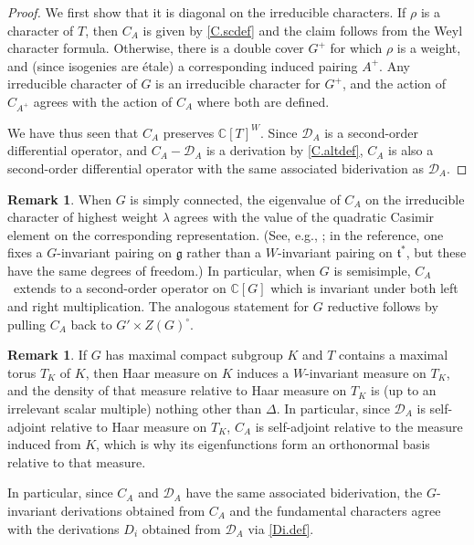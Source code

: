 \documentclass[JEP,XML,SOM,Unicode,NoFloatCountersInSection,published]{cedram}
\theoremstyle{definition}
\newtheorem{rmk}[equation]{Remark}
\let\ic\circ
\newcommand{\mfg}{\mathfrak{g}}
\newcommand{\mft}{\mathfrak{t}}
\newcommand{\C}{\mathbb{C}}
\newcommand{\mcD}{\mathcal{D}}
\begin{document}
\begin{proof}
We first show that it is diagonal on the irreducible characters. If
$\rho$ is a character of $T$, then $C_A$ is given by \eqref{C.scdef} and the claim follows from the Weyl character formula. Otherwise,
there is a double cover $G^+$ for which $\rho$ is a weight, and (since
isogenies are étale) a corresponding induced pairing $A^+$. Any irreducible
character of $G$ is an irreducible character for $G^+$, and the action of
$C_{A^+}$ agrees with the action of $C_A$ where both are defined.

We have thus seen that $C_A$ preserves $\C[T]^W$. Since $\mcD_A$ is a second-order differential operator, and $C_A - \mcD_A$ is a derivation by \eqref{C.altdef}, $C_A$ is also a second-order differential operator with the same associated biderivation as $\mcD_A$.
\end{proof}

\begin{rmk}
When $G$ is simply connected, the eigenvalue of $C_A$ on the irreducible
character of highest weight $\lambda$ agrees with the value of the
quadratic Casimir element on the corresponding representation. (See,
e.g., \cite[Prop.\,10.6]{Hall:2nd}; in the reference, one fixes a
$G$-invariant pairing on $\mfg$ rather than a $W$-invariant pairing
on $\mft^*$, but these have the same degrees of freedom.) In
particular, when $G$ is semisimple, $C_A$~extends to a second-order
operator on $\C[G]$ which is invariant under both left and right
multiplication. The analogous statement for $G$ reductive follows by
pulling $C_A$ back to $G'\times Z(G)^\ic$.
\end{rmk}

\begin{rmk}
If $G$ has maximal compact subgroup $K$ and $T$ contains a maximal torus
$T_K$ of $K$, then Haar measure on $K$ induces a $W$-invariant measure on $T_K$,
and the density of that measure relative to Haar measure on $T_K$ is (up
to an irrelevant scalar multiple) nothing other than $\Delta$. In
particular, since $\mcD_A$ is self-adjoint relative to Haar measure on
$T_K$, $C_A$ is self-adjoint relative to the measure induced from $K$,
which is why its eigenfunctions form an orthonormal basis relative to
that measure.
\end{rmk}

In particular, since $C_A$ and $\mcD_A$ have the same associated
biderivation, the $G$\nobreakdash-invariant derivations obtained from $C_A$ and the
fundamental characters agree with the derivations $D_i$ obtained from
$\mcD_A$ via \eqref{Di.def}.
\end{document}
